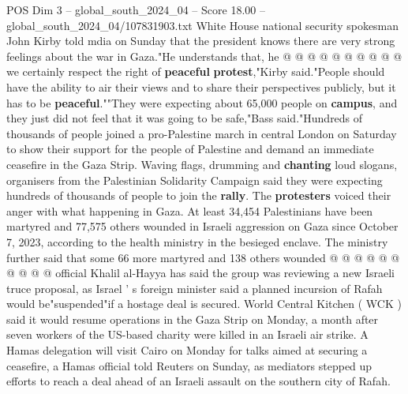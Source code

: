 \begin{textsample}{POS Dim 3 – global\_south\_2024\_04 – Score 18.00 – global\_south\_2024\_04/107831903.txt}
White House national security spokesman John Kirby told mdia on Sunday that the president knows there are very strong feelings about the war in Gaza."He understands that, he @ @ @ @ @ @ @ @ @ @ we certainly respect the right of \textbf{peaceful} \textbf{protest},"Kirby said."People should have the ability to air their views and to share their perspectives publicly, but it has to be \textbf{peaceful}.""They were expecting about 65,000 people on \textbf{campus}, and they just did not feel that it was going to be safe,"Bass said."Hundreds of thousands of people joined a pro-Palestine march in central London on Saturday to show their support for the people of Palestine and demand an immediate ceasefire in the Gaza Strip.
Waving flags, drumming and \textbf{chanting} loud slogans, organisers from the Palestinian Solidarity Campaign said they were expecting hundreds of thousands of people to join the \textbf{rally}.
The \textbf{protesters} voiced their anger with what happening in Gaza.
At least 34,454 Palestinians have been martyred and 77,575 others wounded in Israeli aggression on Gaza since October 7, 2023, according to the health ministry in the besieged enclave.
The ministry further said that some 66 more martyred and 138 others wounded @ @ @ @ @ @ @ @ @ @ official Khalil al-Hayya has said the group was reviewing a new Israeli truce proposal, as Israel ' s foreign minister said a planned incursion of Rafah would be"suspended"if a hostage deal is secured.
World Central Kitchen ( WCK ) said it would resume operations in the Gaza Strip on Monday, a month after seven workers of the US-based charity were killed in an Israeli air strike.
A Hamas delegation will visit Cairo on Monday for talks aimed at securing a ceasefire, a Hamas official told Reuters on Sunday, as mediators stepped up efforts to reach a deal ahead of an Israeli assault on the southern city of Rafah.

\end{textsample}
